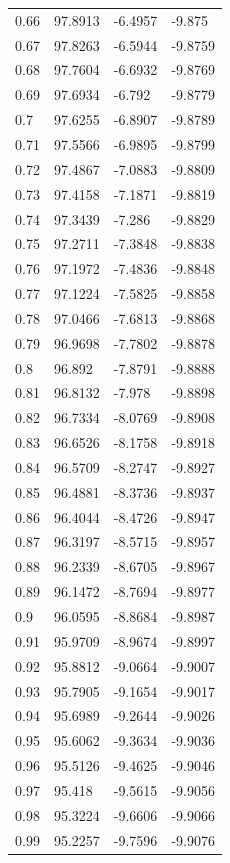 \begin{tabular}{llll}
0.66 & 97.8913 & -6.4957 & -9.875 \\
0.67 & 97.8263 & -6.5944 & -9.8759 \\
0.68 & 97.7604 & -6.6932 & -9.8769 \\
0.69 & 97.6934 & -6.792 & -9.8779 \\
0.7 & 97.6255 & -6.8907 & -9.8789 \\
0.71 & 97.5566 & -6.9895 & -9.8799 \\
0.72 & 97.4867 & -7.0883 & -9.8809 \\
0.73 & 97.4158 & -7.1871 & -9.8819 \\
0.74 & 97.3439 & -7.286 & -9.8829 \\
0.75 & 97.2711 & -7.3848 & -9.8838 \\
0.76 & 97.1972 & -7.4836 & -9.8848 \\
0.77 & 97.1224 & -7.5825 & -9.8858 \\
0.78 & 97.0466 & -7.6813 & -9.8868 \\
0.79 & 96.9698 & -7.7802 & -9.8878 \\
0.8 & 96.892 & -7.8791 & -9.8888 \\
0.81 & 96.8132 & -7.978 & -9.8898 \\
0.82 & 96.7334 & -8.0769 & -9.8908 \\
0.83 & 96.6526 & -8.1758 & -9.8918 \\
0.84 & 96.5709 & -8.2747 & -9.8927 \\
0.85 & 96.4881 & -8.3736 & -9.8937 \\
0.86 & 96.4044 & -8.4726 & -9.8947 \\
0.87 & 96.3197 & -8.5715 & -9.8957 \\
0.88 & 96.2339 & -8.6705 & -9.8967 \\
0.89 & 96.1472 & -8.7694 & -9.8977 \\
0.9 & 96.0595 & -8.8684 & -9.8987 \\
0.91 & 95.9709 & -8.9674 & -9.8997 \\
0.92 & 95.8812 & -9.0664 & -9.9007 \\
0.93 & 95.7905 & -9.1654 & -9.9017 \\
0.94 & 95.6989 & -9.2644 & -9.9026 \\
0.95 & 95.6062 & -9.3634 & -9.9036 \\
0.96 & 95.5126 & -9.4625 & -9.9046 \\
0.97 & 95.418 & -9.5615 & -9.9056 \\
0.98 & 95.3224 & -9.6606 & -9.9066 \\
0.99 & 95.2257 & -9.7596 & -9.9076 \\

\end{tabular}
